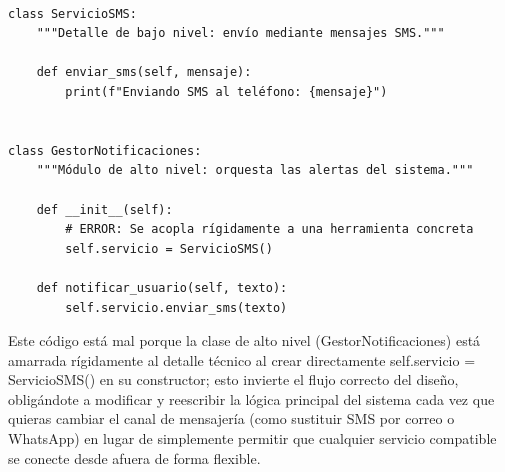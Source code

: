 \documentclass{article}
\begin{document}
        		\begin{verbatim}

class ServicioSMS:
    """Detalle de bajo nivel: envío mediante mensajes SMS."""

    def enviar_sms(self, mensaje):
        print(f"Enviando SMS al teléfono: {mensaje}")


class GestorNotificaciones:
    """Módulo de alto nivel: orquesta las alertas del sistema."""

    def __init__(self):
        # ERROR: Se acopla rígidamente a una herramienta concreta
        self.servicio = ServicioSMS()

    def notificar_usuario(self, texto):
        self.servicio.enviar_sms(texto)

        		\end{verbatim}
        			Este código está mal porque la clase de alto nivel (GestorNotificaciones) está amarrada rígidamente al detalle técnico
					al crear directamente self.servicio = ServicioSMS() en su constructor; esto invierte el flujo correcto del diseño,
					obligándote a modificar y reescribir la lógica principal del sistema cada vez que quieras cambiar el canal de mensajería
					(como sustituir SMS por correo o WhatsApp) en lugar de simplemente permitir que cualquier servicio compatible se 
					conecte desde afuera de forma flexible.\\ \\
\end{document}
